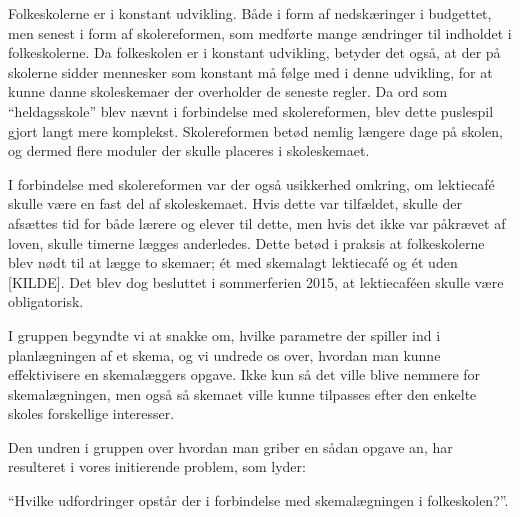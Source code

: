 Folkeskolerne er i konstant udvikling. Både i form af nedskæringer i budgettet, men senest i form af skolereformen, som medførte mange ændringer til indholdet i folkeskolerne. Da folkeskolen er i konstant udvikling, betyder det også, at der på skolerne sidder mennesker som konstant må følge med i denne udvikling, for at kunne danne skoleskemaer der overholder de seneste regler. Da ord som ``heldagsskole'' blev nævnt i forbindelse med skolereformen, blev dette puslespil gjort langt mere komplekst. Skolereformen betød nemlig længere dage på skolen, og dermed flere moduler der skulle placeres i skoleskemaet.

I forbindelse med skolereformen var der også usikkerhed omkring, om lektiecaf\'e skulle være en fast del af skoleskemaet. Hvis dette var tilfældet, skulle der afsættes tid for både lærere og elever til dette, men hvis det ikke var påkrævet af loven, skulle timerne lægges anderledes. Dette betød i praksis at folkeskolerne blev nødt til at lægge to skemaer; \'et med skemalagt lektiecaf\'e og \'et uden [KILDE]. Det blev dog besluttet i sommerferien 2015, at lektiecaf\'een skulle være obligatorisk\cite{Lektiecafe}.

I gruppen begyndte vi at snakke om, hvilke parametre der spiller ind i planlægningen af et skema, og vi undrede os over, hvordan man kunne effektivisere en skemalæggers opgave. Ikke kun så det ville blive nemmere for skemalægningen, men også så skemaet ville kunne tilpasses efter den enkelte skoles forskellige interesser.

Den undren i gruppen over hvordan man griber en sådan opgave an, har resulteret i vores initierende problem, som lyder: 

``Hvilke udfordringer opstår der i forbindelse med skemalægningen i folkeskolen?''.

